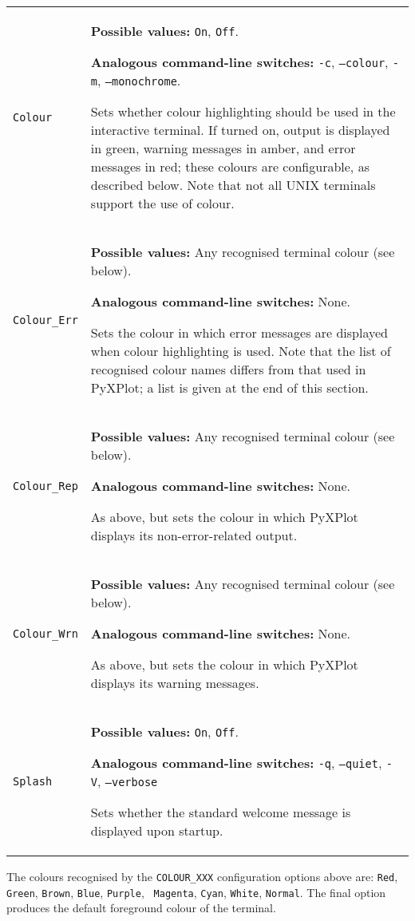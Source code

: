 \begin{longtable}{p{3.4cm}p{9cm}}
{\tt Colour} & {\bf Possible values:} {\tt On}, {\tt Off}.

               {\bf Analogous command-line switches:} {\tt -c}, {\tt --colour}, {\tt -m}, {\tt --monochrome}.

               Sets whether colour highlighting should be used in the interactive terminal. If turned on, output is displayed in green, warning messages in amber, and error messages in red; these colours are configurable, as described below. Note that not all UNIX terminals support the use of colour.
               \\
{\tt Colour\_Err} & {\bf Possible values:} Any recognised terminal colour (see below).

               {\bf Analogous command-line switches:} None.

               Sets the colour in which error messages are displayed when colour highlighting is used. Note that the list of recognised colour names differs from that used in PyXPlot; a list is given at the end of this section.
               \\
{\tt Colour\_Rep} & {\bf Possible values:} Any recognised terminal colour (see below).

               {\bf Analogous command-line switches:} None.

               As above, but sets the colour in which PyXPlot displays its non-error-related output.
               \\
{\tt Colour\_Wrn} & {\bf Possible values:} Any recognised terminal colour (see below).

               {\bf Analogous command-line switches:} None.

               As above, but sets the colour in which PyXPlot displays its warning messages.
               \\
{\tt Splash} & {\bf Possible values:} {\tt On}, {\tt Off}.

               {\bf Analogous command-line switches:} {\tt -q}, {\tt --quiet}, {\tt -V}, {\tt --verbose}

               Sets whether the standard welcome message is displayed upon startup.
               \\
\end{longtable}

The colours recognised by the {\tt COLOUR\_XXX} configuration options above
are: {\tt Red}, {\tt Green}, {\tt Brown}, {\tt Blue}, {\tt Purple}, {\tt
Magenta}, {\tt Cyan}, {\tt White}, {\tt Normal}. The final option produces the
default foreground colour of the terminal.

